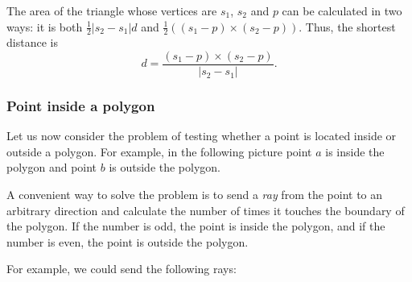 The area of the triangle whose vertices are
$s_1$, $s_2$ and $p$ can be calculated in two ways:
it is both
$\frac{1}{2} |s_2-s_1| d$ and
$\frac{1}{2} ((s_1-p) \times (s_2-p))$.
Thus, the shortest distance is
\[ d = \frac{(s_1-p) \times (s_2-p)}{|s_2-s_1|} .\]

\subsubsection{Point inside a polygon}

Let us now consider the problem of
testing whether a point is located inside or outside
a polygon.
For example, in the following picture point $a$
is inside the polygon and point $b$ is outside
the polygon.

\begin{center}
\end{center}

A convenient way to solve the problem is to
send a \emph{ray} from the point to an arbitrary direction
and calculate the number of times it touches
the boundary of the polygon.
If the number is odd,
the point is inside the polygon,
and if the number is even,
the point is outside the polygon.

\begin{samepage}
For example, we could send the following rays:
\begin{center}
\end{center}
\end{samepage}

